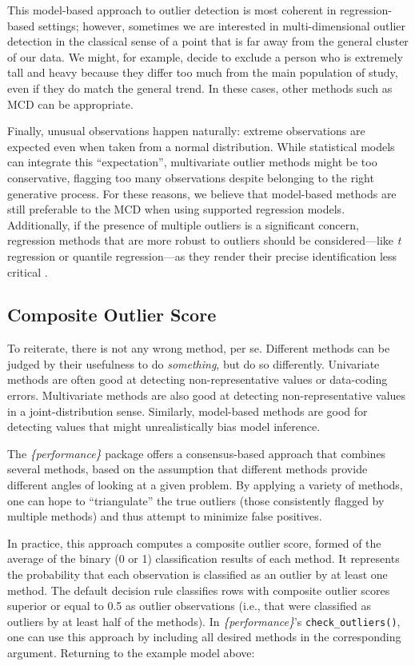 \documentclass[sn-basic, lineno,pdflatex]{sn-jnl}
\begin{document}
This model-based approach to outlier detection is most coherent in
regression-based settings; however, sometimes we are interested in
multi-dimensional outlier detection in the classical sense of a point
that is far away from the general cluster of our data. We might, for
example, decide to exclude a person who is extremely tall and heavy
because they differ too much from the main population of study, even if
they do match the general trend. In these cases, other methods such as
MCD can be appropriate.

Finally, unusual observations happen naturally: extreme observations are
expected even when taken from a normal distribution. While statistical
models can integrate this ``expectation'', multivariate outlier methods
might be too conservative, flagging too many observations despite
belonging to the right generative process. For these reasons, we believe
that model-based methods are still preferable to the MCD when using
supported regression models. Additionally, if the presence of multiple
outliers is a significant concern, regression methods that are more
robust to outliers should be considered---like \emph{t} regression or
quantile regression---as they render their precise identification less
critical \citep{mcelreath2020statistical}.

\subsection{Composite Outlier Score}\label{composite-outlier-score}

To reiterate, there is not any wrong method, per se. Different methods
can be judged by their usefulness to do \emph{something}, but do so
differently. Univariate methods are often good at detecting
non-representative values or data-coding errors. Multivariate methods
are also good at detecting non-representative values in a
joint-distribution sense. Similarly, model-based methods are good for
detecting values that might unrealistically bias model inference.

The \emph{\{performance\}} package offers a consensus-based approach
that combines several methods, based on the assumption that different
methods provide different angles of looking at a given problem. By
applying a variety of methods, one can hope to ``triangulate'' the true
outliers (those consistently flagged by multiple methods) and thus
attempt to minimize false positives.

In practice, this approach computes a composite outlier score, formed of
the average of the binary (0 or 1) classification results of each
method. It represents the probability that each observation is
classified as an outlier by at least one method. The default decision
rule classifies rows with composite outlier scores superior or equal to
0.5 as outlier observations (i.e., that were classified as outliers by
at least half of the methods). In \emph{\{performance\}}'s
\texttt{check\_outliers()}, one can use this approach by including all
desired methods in the corresponding argument. Returning to the example
model above:
\end{document}
